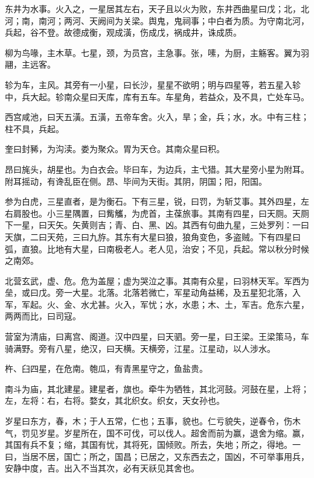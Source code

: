 \documentclass[12pt,UTF8]{ctexbook}
\begin{document}
东井为水事。火入之，一星居其左右，天子且以火为败，东井西曲星曰戊；北，北河；南，南河；两河、天阙间为关梁。舆鬼，鬼祠事；中白者为质。为守南北河，兵起，谷不登。故德成衡，观成潢，伤成戊，祸成井，诛成质。



柳为鸟喙，主木草。七星，颈，为员宫，主急事。张，嗉，为厨，主觞客。翼为羽翮，主远客。



轸为车，主风。其旁有一小星，曰长沙，星星不欲明；明与四星等，若五星入轸中，兵大起。轸南众星曰天库，库有五车。车星角，若益众，及不具，亡处车马。



西宫咸池，曰天五潢。五潢，五帝车舍。火入，旱；金，兵；水，水。中有三柱；柱不具，兵起。



奎曰封豨，为沟渎。娄为聚众。胃为天仓。其南众星曰积。



昂曰旄头，胡星也。为白衣会。毕曰车，为边兵，主弋猎。其大星旁小星为附耳。附耳摇动，有谗乱臣在侧。昂、毕间为天街。其阴，阴国；阳，阳国。



参为白虎，三星直者，是为衡石。下有三星，锐，曰罚，为斩艾事。其外四星，左右肩股也。小三星隅置，曰觜觿，为虎首，主葆旅事。其南有四星，曰天厕。天厕下一星，曰天矢。矢黄则吉；青、白、黑、凶。其西有句曲九星，三处罗列：一曰天旗，二曰天苑，三曰九斿。其东有大星曰狼，狼角变色，多盗贼。下有四星曰弧，直狼。比地有大星，曰南极老人。老人见，治安；不见，兵起。常以秋分时候之南郊。



北营玄武，虚、危。危为盖屋；虚为哭泣之事。其南有众星，曰羽林天军。军西为垒，或曰戊。旁一大星。北落。北落若微亡，军星动角益稀，及五星犯北落，入军，军起。火、金、水尤甚。火入，军忧；水，水患；木、土，军吉。危东六星，两两而比，曰司寇。



营室为清庙，曰离宫、阁道。汉中四星，曰天驷。旁一星，曰王梁。王梁策马，车骑满野。旁有八星，绝汉，曰天横。天横旁，江星。江星动，以人涉水。



杵、臼四星，在危南。匏瓜，有青黑星守之，鱼盐贵。



南斗为庙，其北建星。建星者，旗也。牵牛为牺牲，其北河鼓。河鼓在星，上将；左，左将：右，右将。婺女，其北织女。织女，天女孙也。



岁星曰东方，春，木；于人五常，仁也；五事，貌也。仁亏貌失，逆春令，伤木气，罚见岁星。岁星所在，国不可伐，可以伐人。超舍而前为赢，退舍为缩。赢，其国有兵不复；缩，其国有忧，其将死，国倾败。所去，失地；所之，得地。一曰，当居不居，国亡；所之，国昌；已居之，又东西去之，国凶，不可举事用兵，安静中度，吉。出入不当其次，必有天祅见其舍也。
\end{document}
